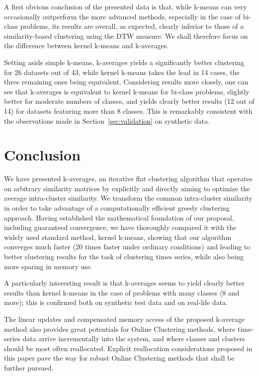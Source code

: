 \documentclass[10pt,journal,compsoc]{IEEEtran}
\begin{document}
A first obvious conclusion of the presented data is that, while k-means can very occasionally outperform the more advanced methods, especially in the case of bi-class problems, its results are overall, as expected, clearly inferior to those of a similarity-based clustering using the DTW measure. We shall therefore focus on the difference between kernel k-means and k-averages.

Setting aside simple k-means, k-averages yields a significantly better clustering for 26 datasets out of 43, while kernel k-means takes the lead in 14 cases, the three remaining ones being equivalent. Considering results more closely, one can see that k-averages is equivalent to kernel k-means for bi-class problems, slightly better for moderate numbers of classes, and yields clearly better results (12 out of 14) for datasets featuring more than 8 classes. This is remarkably consistent with the observations made in Section~\ref{sec:validation} on synthetic data.

\section{Conclusion}

We have presented k-averages, an iterative flat clustering algorithm that operates on arbitrary similarity matrices by explicitly and directly aiming to optimize the average intra-cluster similarity. We transform the common intra-cluster similarity in order to take advantage of a computationally efficient greedy clustering approach. Having established the mathematical foundation of our proposal, including guaranteed convergence, we have thoroughly compared it with the widely used standard method, kernel k-means, showing that our algorithm converges much faster (20 times faster under ordinary conditions) and leading to better clustering results for the task of clustering times series, while also being more sparing in memory use.

A particularly interesting result is that k-averages seems to yield clearly better results than kernel k-means in the case of problems with many classes (8 and more); this is confirmed both on synthetic test data and on real-life data.


The linear updates and compensated memory access of the proposed k-average method also provides great potentials for Online Clustering methods, where time-series data arrive incrementally into the system, and where classes and clusters should be most often reallocated. Explicit reallocation considerations proposed in this paper pave the way for robust Online Clustering methods that shall be further pursued.
\end{document}
